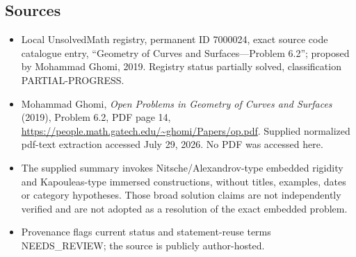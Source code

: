 \documentclass[11pt]{article}
\begin{document}
\subsection{Sources}
\begin{itemize}
\item Local UnsolvedMath registry, permanent ID 7000024, exact source code catalogue entry, ``Geometry of Curves and Surfaces---Problem 6.2''; proposed by Mohammad Ghomi, 2019. Registry status partially solved, classification PARTIAL-PROGRESS.
\item Mohammad Ghomi, \emph{Open Problems in Geometry of Curves and Surfaces} (2019), Problem 6.2, PDF page 14, \url{https://people.math.gatech.edu/~ghomi/Papers/op.pdf}. Supplied normalized pdf-text extraction accessed July 29, 2026. No PDF was accessed here.
\item The supplied summary invokes Nitsche/Alexandrov-type embedded rigidity and Kapouleas-type immersed constructions, without titles, examples, dates or category hypotheses. Those broad solution claims are not independently verified and are not adopted as a resolution of the exact embedded problem.
\item Provenance flags current status and statement-reuse terms NEEDS\_REVIEW; the source is publicly author-hosted.
\end{itemize}
\end{document}
